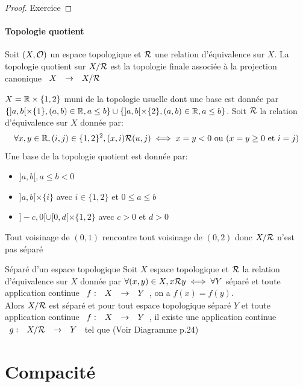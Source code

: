 \documentclass[]{report}
\begin{document}
    \begin{proof}
        Exercice
    \end{proof}

    \subsubsection*{Topologie quotient}

    \begin{df}{}{}
        Soit $(X,\mathcal{O})$ un espace topologique et $\mathcal{R}$ une relation d'équivalence sur $X$. La topologie quotient sur $X/\mathcal{R}$ est la topologie finale associée à la projection canonique $\begin{array}{ccccc} X & \to & X/\mathcal{R} \end{array}$
    \end{df}

    \begin{ex}{}{}
        $X=\mathbb{R}\times\{1,2\}$ muni de la topologie usuelle dont une base est donnée par $\{]a,b[\times \{1\},(a,b)\in\mathbb{R},a\le b\}\cup\{]a,b[\times \{2\},(a,b)\in\mathbb{R},a\le b\}$. Soit $\mathcal{R}$ la relation d'équivalence sur $X$ donnée par:
        \[\forall x,y\in \mathbb{R},(i,j)\in\{1,2\}^2,(x,i)\mathcal{R} (u,j)\iff x=y<0\text{ ou }(x=y\ge 0\text{ et }i=j)\]
        Une base de la topologie quotient est donnée par:
        \begin{itemize}
            \item $]a,b[,a\le b<0$
            \item $]a,b[\times \{i\}$ avec $i\in\{1,2\}$ et $0\le a\le b$
            \item $]-c,0[\cup [0,d[\times\{1,2\}$ avec $c>0$ et $d>0$
        \end{itemize}
        Tout voisinage de $(0,1)$ rencontre tout voisinage de $(0,2)$ donc $X/\mathcal{R}$ n'est pas séparé
    \end{ex}

    \begin{re}{Séparé d'un espace topologique}{}
        Soit $X$ espace topologique et $\mathcal{R}$ la relation d'équivalence sur $X$ donnée par $\forall(x,y)\in X,x\mathcal{R} y\iff \forall Y$ séparé et toute application continue $\begin{array}{ccccc} f : & X & \to & Y \end{array}$, on a $f(x)=f(y)$.\\
        Alors $X/\mathcal{R}$ est séparé et pour tout espace topologique séparé $Y$ et toute application continue $\begin{array}{ccccc} f : & X & \to & Y \end{array}$, il existe une application continue $\begin{array}{ccccc} g : & X/\mathcal{R} & \to & Y \end{array}$ tel que (Voir Diagramme p.24)
    \end{re}

    \chapter{Compacité}
\end{document}
